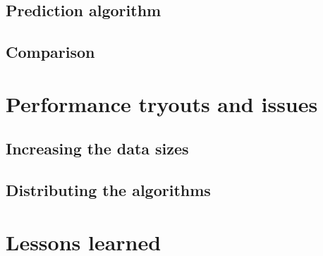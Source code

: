 \documentclass[a4paper,12pt]{article}
\begin{document}
  \subsection{Prediction algorithm}

  \subsection{Comparison}


\section{Performance tryouts and issues}

  \subsection{Increasing the data sizes}

  \subsection{Distributing the algorithms}

\section*{Lessons learned}

  \lipsum[8-9]
\end{document}
